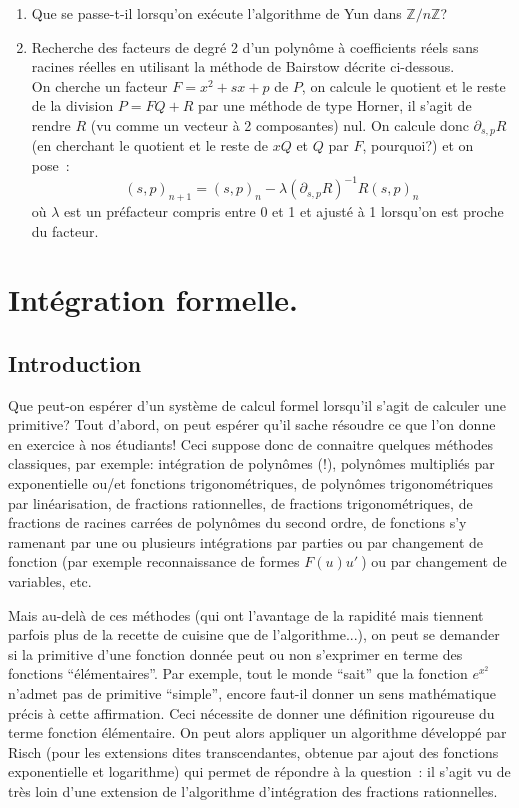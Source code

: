 \documentclass[a4paper,11pt]{book}
\begin{document}
\begin{giacjshere}
\begin{enumerate}
\item Que se passe-t-il lorsqu'on ex\'ecute l'algorithme de Yun
dans $\mathbb{Z}/n\mathbb{Z}$?

\item Recherche des facteurs de degré 2 d'un polynôme à coefficients
réels sans racines réelles en utilisant la méthode de Bairstow décrite
ci-dessous.\\
On cherche un facteur $F=x^2+sx+p$ de $P$, on calcule le quotient et le reste
de la division $P=FQ+R$ par une méthode de type Horner, il s'agit de 
rendre $R$ (vu comme un vecteur à 2 composantes) nul. On calcule
donc $\partial_{s,p} R$ (en cherchant le quotient et le reste
de $xQ$ et $Q$ par $F$, pourquoi?) et on pose~:
\[(s,p)_{n+1}=(s,p)_n- \lambda (\partial_{s,p} R)^{-1} R (s,p)_n\]
où $\lambda$ est un préfacteur compris entre 0 et 1 et ajusté à 1 
lorsqu'on est proche du facteur.


\end{enumerate}

\vfill

\pagebreak

\chapter{Int\'egration formelle.}\label{sec:intg} 
\section{Introduction}
Que peut-on espérer d'un système de calcul formel lorsqu'il s'agit
de calculer une primitive? Tout d'abord, on peut espérer qu'il
sache résoudre ce que l'on donne en exercice à nos étudiants!
Ceci suppose donc de connaitre quelques méthodes classiques, par
exemple: intégration de polynômes (!), polynômes multipliés par exponentielle
ou/et fonctions trigonométriques, de polynômes trigonométriques par
linéarisation, de fractions rationnelles,
de fractions trigonométriques, de fractions de racines carrées de 
polynômes du second ordre, de fonctions s'y ramenant par une ou plusieurs
intégrations par parties ou par
changement de fonction (par exemple reconnaissance de formes $F(u)u'\ $)
ou par changement de variables, etc.

Mais au-delà de ces méthodes (qui ont l'avantage de la rapidité mais
tiennent parfois plus de la
recette de cuisine que de l'algorithme...), on peut se demander 
si la primitive d'une fonction donnée peut ou non s'exprimer en terme 
des fonctions ``élémentaires''. Par exemple, tout le monde ``sait''
que la fonction $e^{x^2}$ n'admet pas de primitive ``simple'', encore
faut-il donner un sens mathématique précis à cette affirmation.
Ceci nécessite de donner une définition rigoureuse du terme fonction
élémentaire. On peut alors appliquer un algorithme développé
par Risch (pour les extensions dites transcendantes, obtenue par ajout
des fonctions exponentielle et logarithme)  
qui permet de répondre à la question~:
il s'agit vu de très loin d'une extension de l'algorithme d'intégration
des fractions rationnelles.


\end{giacjshere}
\end{document}
